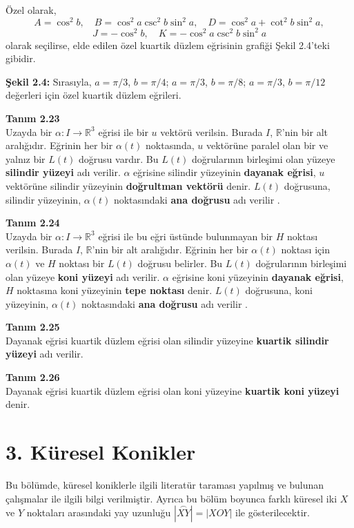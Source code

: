 \documentclass[a4paper,12pt]{article}
\begin{document}
Özel olarak,
\[
A = \cos^2 b, \quad B = \cos^2 a \csc^2 b \sin^2 a, \quad D = \cos^2 a + \cot^2 b \sin^2 a,
\]
\[
J = -\cos^2 b, \quad K = -\cos^2 a \csc^2 b \sin^2 a
\]
olarak seçilirse, elde edilen özel kuartik düzlem eğrisinin grafiği Şekil 2.4'teki gibidir.

\textbf{Şekil 2.4:} Sırasıyla, $a = \pi/3$, $b = \pi/4$; $a = \pi/3$, $b = \pi/8$; $a = \pi/3$, $b = \pi/12$ değerleri için özel kuartik düzlem eğrileri.

\textbf{Tanım 2.23} \\
Uzayda bir $\alpha : I \to \mathbb{R}^3$ eğrisi ile bir $u$ vektörü verilsin. Burada $I$, $\mathbb{R}$'nin bir alt aralığıdır. Eğrinin her bir $\alpha(t)$ noktasında, $u$ vektörüne paralel olan bir ve yalnız bir $L(t)$ doğrusu vardır. Bu $L(t)$ doğrularının birleşimi olan yüzeye \textbf{silindir yüzeyi} adı verilir. $\alpha$ eğrisine silindir yüzeyinin \textbf{dayanak eğrisi}, $u$ vektörüne silindir yüzeyinin \textbf{doğrultman vektörü} denir. $L(t)$ doğrusuna, silindir yüzeyinin, $\alpha(t)$ noktasındaki \textbf{ana doğrusu} adı verilir \cite{ref}.

\textbf{Tanım 2.24} \\
Uzayda bir $\alpha: I \to \mathbb{R}^3$ eğrisi ile bu eğri üstünde bulunmayan bir $H$ noktası verilsin. Burada $I$, $\mathbb{R}$'nin bir alt aralığıdır. Eğrinin her bir $\alpha(t)$ noktası için $\alpha(t)$ ve $H$ noktası bir $L(t)$ doğrusu belirler. Bu $L(t)$ doğrularının birleşimi olan yüzeye \textbf{koni yüzeyi} adı verilir. $\alpha$ eğrisine koni yüzeyinin \textbf{dayanak eğrisi}, $H$ noktasına koni yüzeyinin \textbf{tepe noktası} denir. $L(t)$ doğrusuna, koni yüzeyinin, $\alpha(t)$ noktasındaki \textbf{ana doğrusu} adı verilir \cite{ref}.

\textbf{Tanım 2.25} \\
Dayanak eğrisi kuartik düzlem eğrisi olan silindir yüzeyine \textbf{kuartik silindir yüzeyi} adı verilir.

\textbf{Tanım 2.26} \\
Dayanak eğrisi kuartik düzlem eğrisi olan koni yüzeyine \textbf{kuartik koni yüzeyi} denir.
\section*{3. Küresel Konikler}

Bu bölümde, küresel koniklerle ilgili literatür taraması yapılmış ve bulunan çalışmalar ile ilgili bilgi verilmiştir. Ayrıca bu bölüm boyunca farklı küresel iki $X$ ve $Y$ noktaları arasındaki yay uzunluğu $|\overset{\frown}{XY}| = |XOY|$ ile gösterilecektir.
\end{document}
